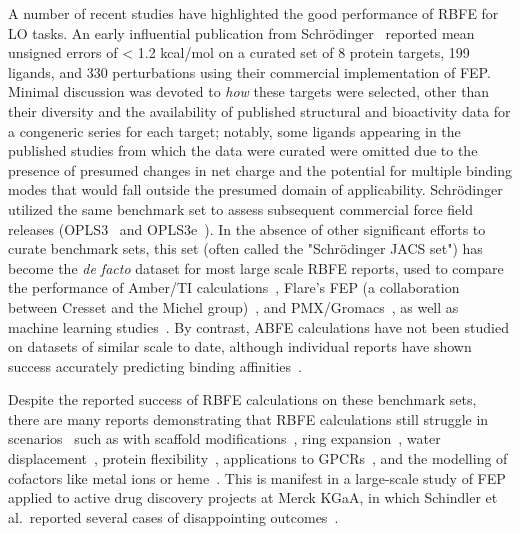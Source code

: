\documentclass[9pt,bestpractices]{livecoms}
\begin{document}
A number of recent studies have highlighted the good performance of RBFE for LO tasks. 
An early influential publication from Schr\"{o}dinger~\cite{wangAccurateReliablePrediction2015} reported mean unsigned errors of < 1.2 kcal/mol on a curated set of 8 protein targets, 199 ligands, and 330 perturbations using their commercial implementation of FEP.
Minimal discussion was devoted to \emph{how} these targets were selected, other than their diversity and the availability of published structural and bioactivity data for a congeneric series for each target; notably, some ligands appearing in the published studies from which the data were curated were omitted due to the presence of presumed changes in net charge and the potential for multiple binding modes that would fall outside the presumed domain of applicability.
Schr\"{o}dinger utilized the same benchmark set to assess subsequent commercial force field releases (OPLS3~\cite{harder_opls3_2016} and OPLS3e~\cite{roos_opls3e_2019}). 
In the absence of other significant efforts to curate benchmark sets, this set (often called the "Schr\"{o}dinger JACS set") has become the \emph{de facto} dataset for most large scale RBFE reports, used to compare the performance of Amber/TI calculations~\cite{songUsingAMBER18Relative2019}, Flare’s FEP (a collaboration between Cresset and the Michel group)~\cite{kuhnAssessmentBindingAffinity2020}, and PMX/Gromacs~\cite{gapsysLargeScaleRelative2020}, as well as machine learning studies~\cite{jimenezDEEPProteinLigand2018,jimenez-lunaDeltaDeltaNeuralNetworks2019}. 
By contrast, ABFE calculations have not been studied on datasets of similar scale to date, although individual reports have shown success accurately predicting binding affinities~\cite{aldeghiLargescaleAnalysisWater2018,courniaRigorousFreeEnergy2020}.

Despite the reported success of RBFE calculations on these benchmark sets, there are many reports demonstrating that RBFE calculations still struggle in scenarios~\cite{sherborne_collaborating_2016} such as with scaffold modifications~\cite{wangAccurateModelingScaffold2017}, ring expansion~\cite{liuRingBreakingFeasible2015}, water displacement~\cite{michel_energetics_2009,brucemacdonald_ligand_2018,ross_enhancing_2020a,ben-shalom_accounting_2020}, protein flexibility~\cite{huang_insights_2012,fratev_improved_2019,singh_absolute_2020}, applications to GPCRs~\cite{lenselink_predicting_2016,deflorian_accurate_2020}, and the modelling of cofactors like metal ions or heme~\cite{swiderek_binding_2011,ono_improvement_2020}. 
This is manifest in a large-scale study of FEP applied to active drug discovery projects at Merck KGaA, in which Schindler et al.\ reported several cases of disappointing outcomes~\cite{schindler_largescale_2020}. 
\end{document}
